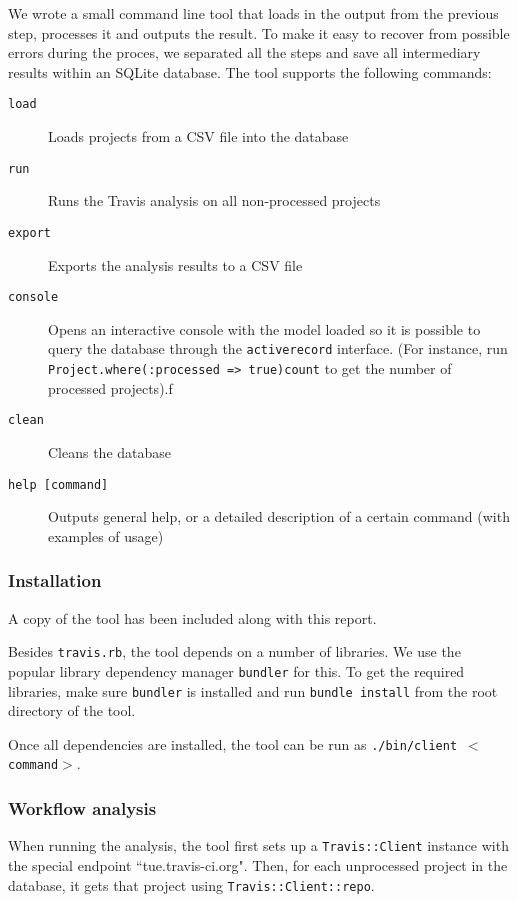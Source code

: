 We wrote a small command line tool that loads in the output from the previous step, processes it and outputs the result.
To make it easy to recover from possible errors during the proces, we separated all the steps and save all intermediary results within an SQLite database.
The tool supports the following commands:

\begin{description}
	\item[\texttt{load}] Loads projects from a CSV file into the database
	\item[\texttt{run}] Runs the Travis analysis on all non-processed projects
	\item[\texttt{export}] Exports the analysis results to a CSV file
	\item[\texttt{console}] Opens an interactive console with the model loaded so it is possible to query the database through the \texttt{activerecord} interface. (For instance, run \texttt{Project.\-where(:processed => true)\-count} to get the number of processed projects).f
	\item[\texttt{clean}] Cleans the database
	\item[\texttt{help [command]}] Outputs general help, or a detailed description of a certain command (with examples of usage)
\end{description}

	\subsubsection{Installation}
	A copy of the tool has been included along with this report.
	
	Besides \texttt{travis.rb}, the tool depends on a number of libraries.
	We use the popular library dependency manager \texttt{bundler} for this.
	To get the required libraries, make sure \texttt{bundler} is installed and run \texttt{bundle install} from the root directory of the tool.
	
	Once all dependencies are installed, the tool can be run as \texttt{./bin/client $<$command$>$}.

	\subsubsection{Workflow analysis}
	When running the analysis, the tool first sets up a \texttt{Travis::Client} instance with the special endpoint ``tue.travis-ci.org".
	Then, for each unprocessed project in the database, it gets that project using \texttt{Travis::Client::repo}.
	
